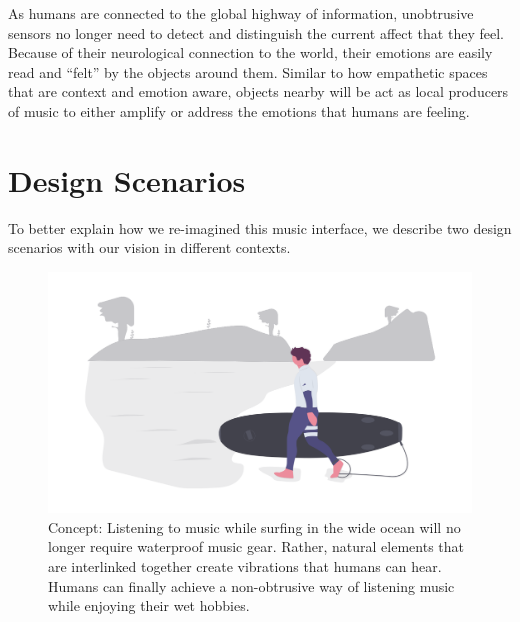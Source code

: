 \documentclass[sigchi]{acmart}
\begin{document}
 As humans are connected to the global highway of information, unobtrusive sensors no longer need to detect and distinguish the current affect that they feel. Because of their neurological connection to the world, their emotions are easily read and ``felt'' by the objects around them. Similar to how empathetic spaces that are context and emotion aware, objects nearby will be act as local producers of music to either amplify or address the emotions that humans are feeling. 

\section{Design Scenarios}
To better explain how we re-imagined this music interface, we describe two design scenarios with our vision in different contexts.

\begin{figure}[h]
  \centering
  \includegraphics[width=\linewidth]{acmart-master-2/samples/surfbnw.png}
  \caption{Concept: Listening to music while surfing in the wide ocean will no longer require waterproof music gear. Rather, natural elements that are interlinked together create vibrations that humans can hear. Humans can finally achieve a non-obtrusive way of listening music while enjoying their wet hobbies. }
  \label{fig: surf}
\end{figure}
\end{document}

